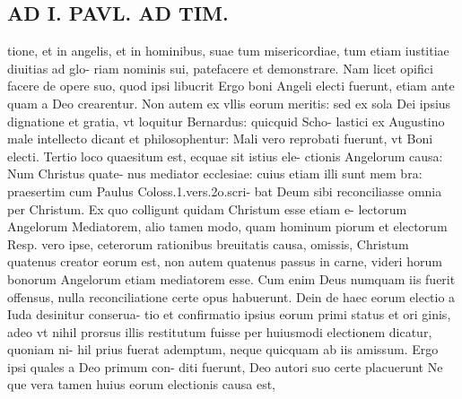 \documentclass{article}
\begin{document}
\begin{pages}
\section*{AD I. PAVL. AD TIM. }
\marginpar{[ p.334 ]}\pstart tione, et in angelis, et in hominibus, suae tum misericordiae, tum etiam iustitiae diuitias ad glo- riam nominis sui, patefacere et demonstrare. Nam licet opifici facere de opere suo, quod ipsi libucrit Ergo boni Angeli electi fuerunt, etiam ante quam a Deo crearentur. Non autem ex vllis eorum meritis: sed ex sola Dei ipsius dignatione et gratia, vt loquitur Bernardus: quicquid Scho- lastici ex Augustino male intellecto dicant et philosophentur: Mali vero reprobati fuerunt, vt Boni electi. Tertio loco quaesitum est, ecquae sit istius ele- ctionis Angelorum causa: Num Christus quate- nus mediator ecclesiae: cuius etiam illi sunt mem bra: praesertim cum Paulus Coloss.1.vers.2o.scri- bat Deum sibi reconciliasse omnia per Christum. Ex quo colligunt quidam Christum esse etiam e- lectorum Angelorum Mediatorem, alio tamen modo, quam hominum piorum et electorum Resp. vero ipse, ceterorum rationibus breuitatis causa, omissis, Christum quatenus creator eorum est, non autem quatenus passus in carne, videri horum bonorum Angelorum etiam mediatorem esse. Cum enim Deus numquam iis fuerit offensus, nulla reconciliatione certe opus habuerunt. Dein de haec eorum electio a Iuda desinitur conserua- tio et confirmatio ipsius eorum primi status et ori ginis, adeo vt nihil prorsus illis restitutum fuisse per huiusmodi electionem dicatur, quoniam ni- hil prius fuerat ademptum, neque quicquam ab iis amissum. Ergo ipsi quales a Deo primum con- diti fuerunt, Deo autori suo certe placuerunt Ne que vera tamen huius eorum electionis causa est,  \pend

\end{pages}
\end{document}
